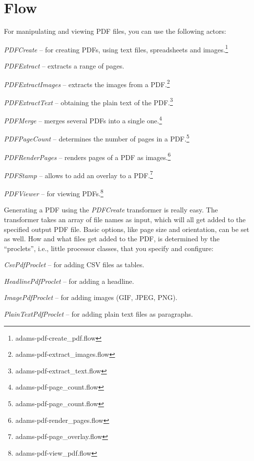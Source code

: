 \documentclass[a4paper]{book}
\begin{document}
\chapter{Flow}
For manipulating and viewing PDF files, you can use the following actors:
\begin{tight_itemize}
	\item \textit{PDFCreate} -- for creating PDFs, using text files, 
	spreadsheets and images.\footnote{adams-pdf-create\_pdf.flow}
	\item \textit{PDFExtract} -- extracts a range of pages.
	\item \textit{PDFExtractImages} -- extracts the images from a PDF.\footnote{adams-pdf-extract\_images.flow}
	\item \textit{PDFExtractText} -- obtaining the plain text of the PDF.\footnote{adams-pdf-extract\_text.flow}
	\item \textit{PDFMerge} -- merges several PDFs into a single one.\footnote{adams-pdf-page\_count.flow}
	\item \textit{PDFPageCount} -- determines the number of pages in a 
	PDF.\footnote{adams-pdf-page\_count.flow}
	\item \textit{PDFRenderPages} -- renders pages of a PDF as images.\footnote{adams-pdf-render\_pages.flow}
	\item \textit{PDFStamp} -- allows to add an overlay to a PDF.\footnote{adams-pdf-page\_overlay.flow}
	\item \textit{PDFViewer} -- for viewing PDFs.\footnote{adams-pdf-view\_pdf.flow}
\end{tight_itemize}

Generating a PDF using the \textit{PDFCreate} transformer is really easy.
The transformer takes an array of file names as input, which will all get added
to the specified output PDF file. Basic options, like page size and orientation,
can be set as well. How and what files get added to the PDF, is determined by
the ``proclets'', i.e., little processor classes, that you specify and configure:
\begin{tight_itemize}
	\item \textit{CsvPdfProclet} -- for adding CSV files as tables.
	\item \textit{HeadlinePdfProclet} -- for adding a headline.
	\item \textit{ImagePdfProclet} -- for adding images (GIF, JPEG, PNG).
	\item \textit{PlainTextPdfProclet} -- for adding plain text files as paragraphs.
\end{tight_itemize}
\end{document}
